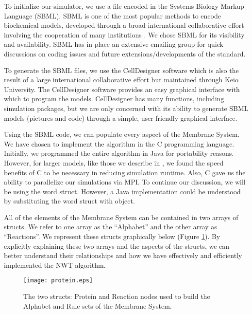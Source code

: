 \documentclass[copyright]{eptcs}
\begin{document}
To initialize our simulator, we use a file encoded in the Systems Biology Markup Language (SBML).  SBML is one of the most popular methods to encode biochemical models, developed through a broad international collaborative effort involving the cooperation of many institutions \cite{hucka03}.  We chose SBML for its visibility and availability.  SBML has in place an extensive emailing group for quick discussions on coding issues and future extensions/developments of the standard.  

To generate the SBML files, we use the CellDesigner software \cite{funahashi03,funahashi08} which is also the result of a large international collaborative effort but maintained through Keio University.  The CellDesigner software provides an easy graphical interface with which to program the models.  CellDesigner has many functions, including simulation packages, but we are only concerned with its ability to generate SBML models (pictures and code) through a simple, user-friendly graphical interface.

















Using the SBML code, we can populate every aspect of the Membrane System.  We have chosen to implement the algorithm in the C programming language.  Initially, we programmed the entire algorithm in Java for portability reasons. However, for larger models, like those we describe in \cite{jack07,jack08,jack08hiv}, we found the speed benefits of C to be necessary in reducing simulation runtime.  Also, C gave us the ability to parallelize our simulations via MPI.  To continue our discussion, we will be using the word struct.  However, a Java implementation could be understood by substituting the word struct with object.

All of the elements of the Membrane System can be contained in two arrays of structs.  We refer to one array as the ``Alphabet'' and the other array as ``Reactions''.  We represent these structs graphically below (Figure \ref{thestructs}).  By explicitly explaining these two arrays and the aspects of the structs, we can better understand their relationships and how we have effectively and efficiently implemented the NWT algorithm.

\begin{figure}[ht]
\centering
\texttt{[image: protein.eps]}
\caption{The two structs: Protein and Reaction nodes used to build the Alphabet and Rule sets of the Membrane System.}
\label{thestructs}
\end{figure}
\end{document}
